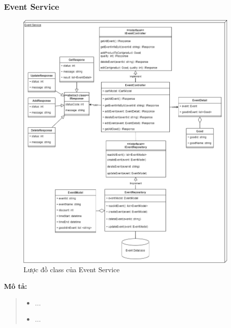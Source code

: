 \subsubsection{Event Service}
\begin{figure}[!htp]
	\centering
	\includegraphics[width=11cm]{img/Architecture/service/EventService.png}
	\newline
	\caption{Lược đồ class của Event Service}
\end{figure}
\textbf{Mô tả:}
\begin{quote}
	\begin{itemize}
		\item ...
		\item ...
	\end{itemize}
\end{quote}

